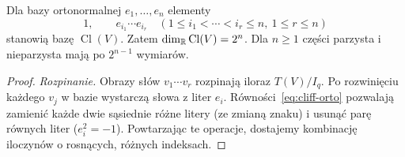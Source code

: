 \begin{twierdzenie}
\label{thm:cliff-baza}
Dla bazy ortonormalnej $e_1,\ldots,e_n$ elementy
\[
 1,\qquad e_{i_1}\cdots e_{i_r}
 \quad(1\leq i_1<\cdots<i_r\leq n,\ 1\leq r\leq n)
\]
stanowią bazę $\operatorname{Cl}(V)$. Zatem
$\dim_{\mathbb{R}}\operatorname{Cl}(V)=2^n$.
Dla $n\geq1$ części parzysta i nieparzysta mają
po $2^{n-1}$ wymiarów.
\end{twierdzenie}
\begin{proof}
\emph{Rozpinanie.} Obrazy słów $v_1\cdots v_r$
rozpinają iloraz $T(V)/I_q$. Po rozwinięciu każdego
$v_j$ w bazie wystarczą słowa z liter $e_i$.
Równości~\eqref{eq:cliff-orto} pozwalają zamienić
każde dwie sąsiednie różne litery (ze zmianą znaku)
i usunąć parę równych liter ($e_i^2=-1$).
Powtarzając te operacje, dostajemy kombinację
iloczynów o rosnących, różnych indeksach.


\end{proof}
